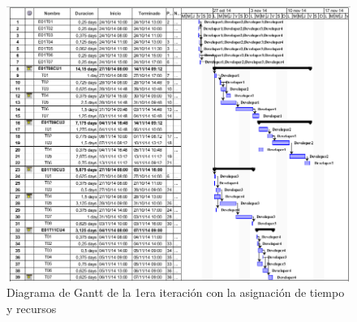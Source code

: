 \begin{figure}[h!]
  \centering
  \includegraphics[width=1\textwidth]{plan.png}
  \caption{Diagrama de Gantt de la 1era iteración con la asignación de tiempo y recursos}
  \label{fig:gantt}
\end{figure}
